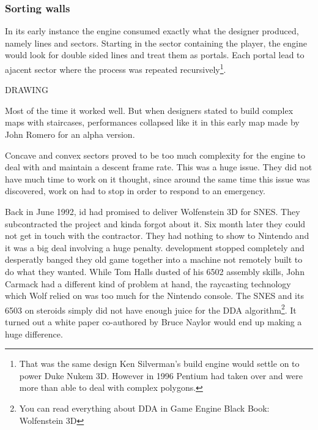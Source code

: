 \subsubsection{Sorting walls}
In its early instance the engine consumed exactly what the designer produced, namely lines and sectors. Starting in the sector containing the player, the engine would look for double sided lines and treat them as portals. Each portal lead to ajacent sector where the process was repeated recursively\footnote{That was the same design Ken Silverman's build engine would settle on to power Duke Nukem 3D. However in 1996 Pentium had taken over and were more than able to deal with complex polygons.}.\\
\par
DRAWING\\
\par
Most of the time it worked well. But when designers stated to build complex maps with staircases, performances collapsed like it in this early map made by John Romero for an alpha version.\\
\par
{} \label{HUD_screenshot}
\par
{}
\par
Concave and convex sectors proved to be too much complexity for the engine to deal with and maintain a descent frame rate. This was a huge issue. They did not have much time to work on it thought, since around the same time this issue was discovered, work on \doom had to stop in order to respond to an emergency.\\
\par
Back in June 1992, id had promised to deliver Wolfenstein 3D for SNES. They subcontracted the project and kinda forgot about it. Six month later they could not get in touch with the contractor. They had nothing to show to Nintendo and it was a big deal involving a huge penalty.  \doom development stopped completely and desperatly banged they old game together into a machine not remotely built to do what they wanted. While Tom Halls dusted of his 6502 assembly skills, John Carmack had a different kind of problem at hand, the raycasting technology which Wolf relied on was too much for the Nintendo console. The SNES and its 6503 on steroids simply did not have enough juice for the DDA algorithm\footnote{You can read everything about DDA in Game Engine Black Book: Wolfenstein 3D}. It turned out a white paper co-authored by Bruce Naylor would end up making a huge difference.\\
\par




